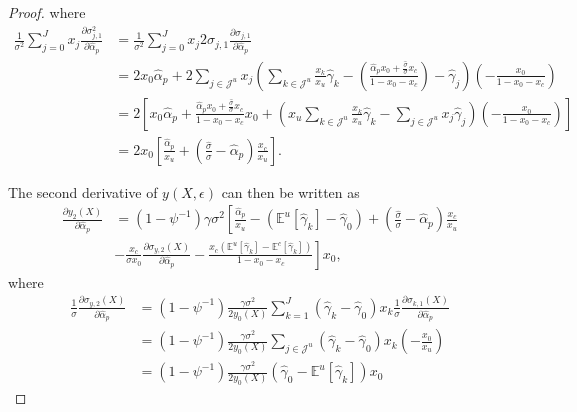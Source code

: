 \begin{proof}
	where
	\begin{align}
	\frac{1}{\sigma^2}\sum_{j=0}^J x_j \frac{\partial \sigma_{j,1}^2}{\partial \hat{\alpha}_p} &=\frac{1}{\sigma^2} \sum_{j=0}^J x_j2 \sigma_{j,1} \frac{\partial \sigma_{j,1}}{\partial \hat{\alpha}_p} \nonumber\\
	&= 2 x_0  \hat{\alpha}_p  + 2 \sum_{j\in\mathcal{J}^u} x_j \left( \sum_{k\in\mathcal{J}^u} \frac{x_k}{x_u} \hat{\gamma}_k -\left(\frac{\hat{\alpha}_p  x_0+\frac{\hat{\sigma}}{\sigma}x_c}{1-x_0-x_c}\right)- \hat{\gamma}_j\right) \left( -\frac{x_0}{1-x_0-x_c}\right) \nonumber \\
	&= 2 \left[ x_0 \hat{\alpha}_p + \frac{\hat{\alpha}_p x_0+\frac{\hat{\sigma}}{\sigma}x_c}{1-x_0-x_c}x_0+ \left(x_u \sum_{k\in\mathcal{J}^u} \frac{x_k}{x_u} \hat{\gamma}_k - \sum_{j\in\mathcal{J}^u} x_j\hat{\gamma}_j\right) \left( -\frac{x_0}{1-x_0-x_c}\right)\right] \nonumber \\
	&= 2 x_0 \left[\frac{\hat{\alpha}_p}{x_u} + \left(\frac{\hat{\sigma}}{\sigma} - \hat{\alpha}_p \right)\frac{x_c}{x_u}\right].
	\end{align}
	
	The second derivative of $y(X,\epsilon)$ can then be written as
	\begin{align}
	\frac{\partial y_2(X)}{\partial \hat{\alpha}_p}   &=\left(1-\psi^{-1}\right) \gamma \sigma^2 \left[\frac{\hat{\alpha}_p}{x_u}- (\mathbb{E}^u[\hat{\gamma}_k]-\hat{\gamma}_0) + \left(\frac{\hat{\sigma}}{\sigma} - \hat{\alpha}_p \right)\frac{x_c}{x_u}\nonumber\right.\\ 
	&\left. - \frac{x_c}{\sigma x_0} \frac{\partial \sigma_{y,2}(X)}{\partial \hat{\alpha}_p} -\frac{  x_c \left(\mathbb{E}^u[\hat{\gamma}_k]- \mathbb{E}^c[\hat{\gamma}_k]\right) }{1-x_0-x_c}  \right] x_0, \nonumber 
	\end{align}
	where 
	\begin{align}
	\frac{1}{\sigma}\frac{\partial \sigma_{y,2}(X)}{\partial \hat{\alpha}_p}  &= \left(1-\psi^{-1}\right)\frac{\gamma\sigma^2}{2 y_{0}(X)} \sum_{k=1}^J \left( \hat{\gamma}_k - \hat{\gamma}_0  \right) x_k\frac{1}{\sigma}\frac{\partial \sigma_{k,1}(X)}{\partial \hat{\alpha}_p}\nonumber\\
	&= \left(1-\psi^{-1}\right)\frac{\gamma\sigma^2}{2 y_{0}(X)} \sum_{j\in\mathcal{J}^u} \left( \hat{\gamma}_k - \hat{\gamma}_0  \right) x_k \left( -\frac{x_0}{x_u} \right) \nonumber\\
	&= \left(1-\psi^{-1}\right)\frac{\gamma\sigma^2}{2 y_{0}(X)}\left(\hat{\gamma}_0- \mathbb{E}^u[\hat{\gamma}_k] \right) x_0
	\end{align}
	

\end{proof}
